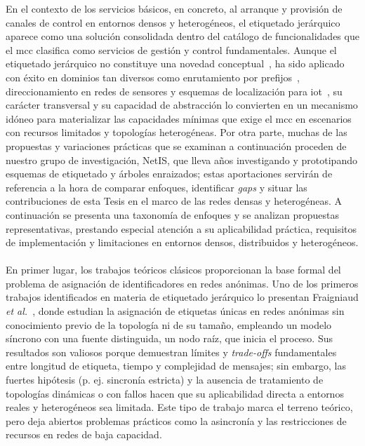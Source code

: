 En el contexto de los servicios básicos, en concreto, al arranque y provisión de canales de control en entornos densos y heterogéneos, el etiquetado jerárquico aparece como una solución consolidada dentro del catálogo de funcionalidades que el \gls{mcc} clasifica como servicios de gestión y control fundamentales. Aunque el etiquetado jerárquico no constituye una novedad conceptual~\cite{fraigniaud2000assigning}, ha sido aplicado con éxito en dominios tan diversos como enrutamiento por prefijos~\cite{rojas2012torii}, direccionamiento en redes de sensores y esquemas de localización para \gls{iot}~\cite{rojas2021outperforming}, su carácter transversal y su capacidad de abstracción lo convierten en un mecanismo idóneo para materializar las capacidades mínimas que exige el \gls{mcc} en escenarios con recursos limitados y topologías heterogéneas. Por otra parte, muchas de las propuestas y variaciones prácticas que se examinan a continuación proceden de nuestro grupo de investigación, NetIS, que lleva años investigando y prototipando esquemas de etiquetado y árboles enraizados; estas aportaciones servirán de referencia a la hora de comparar enfoques, identificar \textit{gaps} y situar las contribuciones de esta Tesis en el marco de las redes densas y heterogéneas. A continuación se presenta una taxonomía de enfoques y se analizan propuestas representativas, prestando especial atención a su aplicabilidad práctica, requisitos de implementación y limitaciones en entornos densos, distribuidos y heterogéneos.\\
\\
En primer lugar, los trabajos teóricos clásicos proporcionan la base formal del problema de asignación de identificadores en redes anónimas. Uno de los primeros trabajos identificados en materia de etiquetado jerárquico lo presentan Fraigniaud \textit{et al.}~\cite{fraigniaud2000assigning}, donde estudian la asignación de etiquetas únicas en redes anónimas sin conocimiento previo de la topología ni de su tamaño, empleando un modelo síncrono con una fuente distinguida, un nodo raíz, que inicia el proceso. Sus resultados son valiosos porque demuestran límites y \textit{trade-offs} fundamentales entre longitud de etiqueta, tiempo y complejidad de mensajes; sin embargo, las fuertes hipótesis (p. ej. sincronía estricta) y la ausencia de tratamiento de topologías dinámicas o con fallos hacen que su aplicabilidad directa a entornos reales y heterogéneos sea limitada. Este tipo de trabajo marca el terreno teórico, pero deja abiertos problemas prácticos como la asincronía y las restricciones de recursos en redes de baja capacidad.\\
